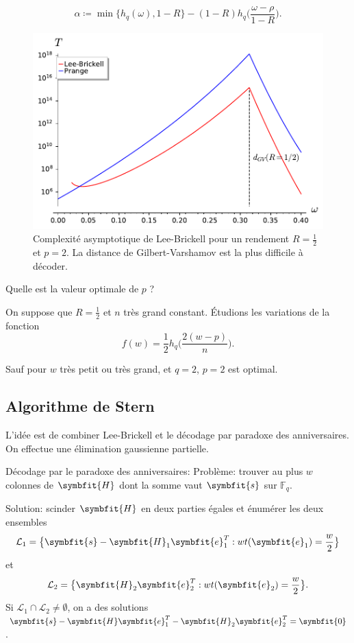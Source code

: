 \documentclass[a4paper,11pt,headings=small,footinclude=false]{scrartcl}
\theoremstyle{definition}
\theoremstyle{remark}
\begin{document}
\[
\alpha \coloneq \min\{ h_q(\omega), 1-R \} - (1-R) h_q\bigg(\frac{\omega - \rho}{1-R}\bigg).
\]

\begin{figure}[h]
\centering
\includegraphics{decodage_syndrome/LB.pdf}
\caption{Complexité asymptotique de Lee-Brickell pour un rendement $R=\frac{1}{2}$ et $p=2$. La distance de Gilbert-Varshamov est la plus difficile à décoder.}
\label{fig:prange}
\end{figure}

Quelle est la valeur optimale de $p$ ?

On suppose que $R=\frac{1}{2}$ et $n$ très grand constant.
Étudions les variations de la fonction
\[
f(w)= \frac{1}{2} h_q\bigg(\frac{2(w - p)}{n}\bigg).
\]


Sauf pour $w$ très petit ou très grand, et $q=2$, $p=2$ est optimal.



\subsection{Algorithme de Stern}

L'idée est de combiner Lee-Brickell et le décodage par paradoxe des anniversaires. On effectue une élimination gaussienne partielle.

Décodage par le paradoxe des anniversaires:
Problème: trouver au plus $w$ colonnes de $\symbfit{H}$ dont la somme vaut $\symbfit{s}$ sur $\mathbb{F}_q$.

Solution: scinder $\symbfit{H}$ en deux parties égales et énumérer les deux ensembles
\[\mathcal{L}_1=\big\{ \symbfit{s}-\symbfit{H}_1\symbfit{e}_1^T : wt(\symbfit{e}_1) =\frac{w}{2} \big\}\]
et \[\mathcal{L}_2=\big\{ \symbfit{H}_2 \symbfit{e}_2^T : wt(\symbfit{e}_2) = \frac{w}{2}\big\}.\]
Si $\mathcal{L}_1\cap \mathcal{L}_2\neq \emptyset$, on a des solutions $\symbfit{s}-\symbfit{H}\symbfit{e}_1^T-\symbfit{H}_2\symbfit{e}_2^T=\symbfit{0}$.
\end{document}
